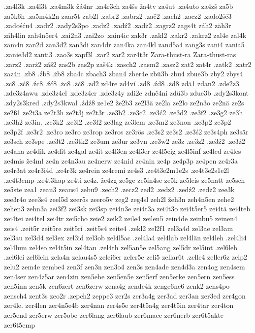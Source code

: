 {{.za4l3k
.za4l3t
.za4m3k
žá4nr
.za4r3ch
za4šs
ža4tv
za4ut
.za4uto
za4zš
za5b
za5k6h
.za5m4k2n
zaar5t
zab2l
.zabr2
.zabrz2
.zač2
.zach2
.zacz2
.zado2ść3
.zadośću4
.zadr2
.zady2s3po
.zadz2
.zadź2
.zadż2
.zagrz2
zags4t
záh2
zäh3r
zäh4lin
zah4n5er4
.zai2n3
.zai2zo
.zain4ic
zak3r
.zakl2
.zakr2
.zakrz2
zal4e
zal4k
zam4n
zan2d
zan3d2
zan3di
zan4dr
zan4ka
zan4kl
zand5a4
zang3s
zani4
zania5
.zanie3d2
zanti3
.zao3s
zapf3l
.zar2
zar2
zar4t3r
Zara-thust-ra
Zara-thust-ras
.zarz2
.zarż2
záš2
zas2b
zas2p
zaš4k
.zasch2
.zasm2
.zasz2
zat2
zat4r
.zatk2
.zatr2
zaz4n
.zb8
.źb8
.żb8
zba4c
zbach3
zban4
zber4e
zbü3b
zbu4
zbue3b
zby2
zbys4
.zc8
.zć8
.źc8
.źć8
.żc8
.żć8
.zd2
zd4re
zd4ví
.zd8
.źd8
.żd8
zdä1
zdan2
.zde2z3
.zde3z4awu
.zde3z4el
.zde3z4er
.zde3z4y
zdi2e
zdně4ní
zdü3b
zdue3b
.zdy2s3kont
.zdy2s3kred
.zdy2s3kwal
.źdź8
ze1e2
že2b3
ze2l3ä
ze2la
ze2lo
ze2n3o
ze2nä
ze2s
ze2ß1
ze2t3a
ze2t3h
ze2t3j
ze2t3r
.ze3b2
.ze3c2
.ze3ć2
.ze3d2
.ze3f2
.ze3g2
ze3h
.ze3h2
ze3in.
.ze3k2
.ze3l2
.ze3ł2
ze3lag
ze3lem
.ze3m2
ze3non
.ze3p2
ze3p2
ze3p2f
.ze3r2
.ze3ro
ze3ro
ze3rop
ze3ros
ze3rös
.ze3s2
ze3s2
.ze3ś2
ze3s4ph
ze3sär
ze3sch
ze3spe
.ze3t2
.ze3tk2
ze3um
ze3ur
ze3vn
.ze3w2
ze3z
.ze3z2
.ze3ź2
.ze3ż2
ze4ana
ze4dik
ze4dit
ze4gal
ze4it
ze4l3en
ze4l3er
ze4l5eig
ze4l5inf
ze4led
ze4les
ze4mis
že4ml
ze4n
ze4n3au
ze4nerw
ze4nid
ze4nin
ze4p
ze4p3p
ze4pen
ze4r3a
ze4r3at
ze4r3i4d
.ze4r3k
ze4rein
ze4remi
ze4s3
.ze4t3e2m1e2s
.ze4t3e2s1e2l
.ze4t3emp
.ze4t3hap
ze4ti
ze4z.
že4zg
ze5ge
ze5in4se
ze5k
ze5leis
ze5natt
ze5sch
ze5ste
zea1
zeau3
zeaus4
zebu9
.zech2
.zecz2
zed2
.zedz2
.zedź2
.zedż2
zee3k
zee3r4o
zee3s4
zeel5d
zeer5s
zeero5v
zeg2
zeg4sl
zeh2l
žeh3n
zeh4n5en
zehe2
zehen3
zehn3a
zei3f2
zei3sk
zei3sp
zei4n3e
zei4t3a
zei4t3o
zei4t5er5
zei4tä
zei4teb
zei4tei
zei4tel
zei4tr
zei5cho
zeie2
zeik2
zeile4
zeilen5
zein4de
zeinbu5
zeinen4
zeis4
.zeit5r
zeit5re
zeit5ri
.zeit5s4
zeite4
.zekl2
zel2f1
zel3a4d
zel3ae
zel3am
zel3au
zel3d4
zel3ex
zel3id
zel3ob
zel4l5ac
.zel4la4
zel4lab
zel4län
zel4leh
.zel4li4
zel4lum
zel4so
zel4t5in
zel4tau
.zel4th
zel5an5e
zel5ang
zel5dr
zel5int
.zel6leb
.zel6lei
zel6lein
zela4n
zelau4s5
zelei6er
zeler5e
zeli5
zellar6t
.zelle4
zeller6z
zelp2
zelu2
zem4e
zembe4
zen3f
zen3n
zen3o4
zen3s
zen4ade
zen4d3a
zen4og
zen4sem
zen4ser
zen4z5ar
zen4zin
zen5ebe
zen5en5e
zen5erf
zen5erke
zen5ern
zen5ess
zen5inn
zen5k
zen6zert
zen6zerw
zena4g
zende4k
zenge6ne6
zenk2
zens4po
zensch4
zent3s
zeo2r
.zepch2
zeppe3
zer2s
zer3a4g
zer3ad
zer3an
zer3ed
zer4gon
zer4le.
zer4len
zer4n5e4b
zer4nan
zer4s5e
zer4t5a4g
zer4t5in
zer4tar
zer4ton
zer5end
zer5erw
zer5obe
zer6lang
zer6laub
zer6maec
zer6nerb
zer6t5akte
zer6t5emp
}}
